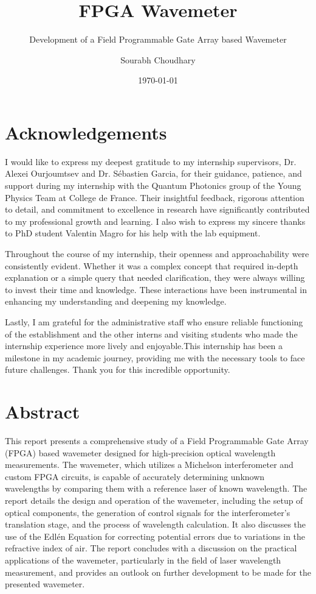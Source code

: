 \documentclass[12pt, twoside]{report}
\title{FPGA Wavemeter}
\subtitle{Development of a Field Programmable Gate Array based Wavemeter}
\author{Sourabh Choudhary}
\date{\today}
\begin{document}
\pagestyle{empty}



\chapter*{Acknowledgements}
\noindent 

I would like to express my deepest gratitude to my internship supervisors, Dr. Alexei Ourjoumtsev and Dr. Sébastien Garcia, for their guidance, patience, and support during my internship with the Quantum Photonics group of the Young Physics Team at College de France. Their insightful feedback, rigorous attention to detail, and commitment to excellence in research have significantly contributed to my professional growth and learning. I also wish to express my sincere thanks to PhD student Valentin Magro for his help with the lab equipment.
\vspace{1em}

Throughout the course of my internship, their openness and approachability were consistently evident. Whether it was a complex concept that required in-depth explanation or a simple query that needed clarification, they were always willing to invest their time and knowledge. These interactions have been instrumental in enhancing my understanding and deepening my knowledge.
\vspace{1em}

Lastly, I am grateful for the administrative staff who ensure reliable functioning of the establishment and the other interns and visiting students who made the internship experience more lively and enjoyable.This internship has been a milestone in my academic journey, providing me with the necessary tools to face future challenges. Thank you for this incredible opportunity.

\chapter*{Abstract}
\noindent 

This report presents a comprehensive study of a Field Programmable Gate Array (FPGA) based wavemeter designed for high-precision optical wavelength measurements. The wavemeter, which utilizes a Michelson interferometer and custom FPGA circuits, is capable of accurately determining unknown wavelengths by comparing them with a reference laser of known wavelength. The report details the design and operation of the wavemeter, including the setup of optical components, the generation of control signals for the interferometer's translation stage, and the process of wavelength calculation. It also discusses the use of the Edlén Equation for correcting potential errors due to variations in the refractive index of air. The report concludes with a discussion on the practical applications of the wavemeter, particularly in the field of laser wavelength measurement, and provides an outlook on further development to be made for the presented wavemeter.
\end{document}
